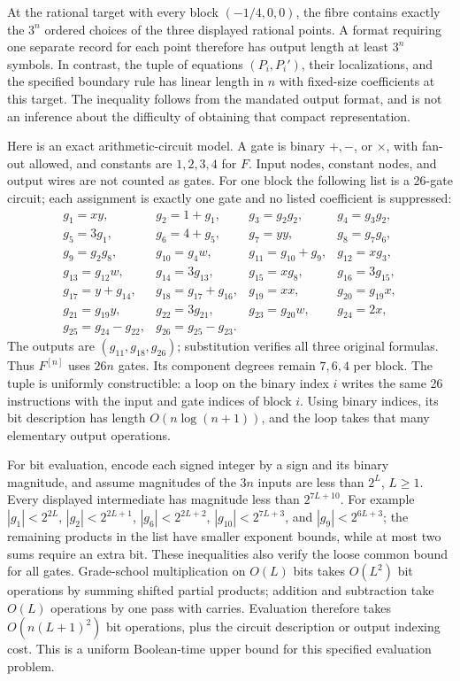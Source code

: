 At the rational target with every block $(-1/4,0,0)$, the fibre contains
exactly the $3^n$ ordered choices of the three displayed rational points.
A format requiring one separate record for each point therefore has
output length at least $3^n$ symbols. In contrast, the tuple of equations
$(P_i,P_i')$, their localizations, and the specified boundary rule has
linear length in $n$ with fixed-size coefficients at this target. The
inequality follows from the mandated output format, and is not an
inference about the difficulty of obtaining that compact representation.

Here is an exact arithmetic-circuit model. A gate is binary $+,-$, or
$\times$, with fan-out allowed, and constants are $1,2,3,4$ for $F$.
Input nodes, constant nodes, and output wires are not counted as gates.
For one block the following list is a 26-gate circuit; each assignment
is exactly one gate and no listed coefficient is suppressed:
\[
\begin{array}{llll}
 g_1=xy,&g_2=1+g_1,&g_3=g_2g_2,&g_4=g_3g_2,\\
 g_5=3g_1,&g_6=4+g_5,&g_7=yy,&g_8=g_7g_6,\\
 g_9=g_2g_8,&g_{10}=g_4w,&g_{11}=g_{10}+g_9,&g_{12}=xg_3,\\
 g_{13}=g_{12}w,&g_{14}=3g_{13},&g_{15}=xg_8,&g_{16}=3g_{15},\\
 g_{17}=y+g_{14},&g_{18}=g_{17}+g_{16},&g_{19}=xx,&g_{20}=g_{19}x,\\
 g_{21}=g_{19}y,&g_{22}=3g_{21},&g_{23}=g_{20}w,&g_{24}=2x,\\
 g_{25}=g_{24}-g_{22},&g_{26}=g_{25}-g_{23}.&&
\end{array}
\]
The outputs are $(g_{11},g_{18},g_{26})$; substitution verifies all
three original formulas. Thus $F^{[n]}$ uses $26n$ gates. Its component
degrees remain $7,6,4$ per block. The tuple is uniformly constructible:
a loop on the binary index $i$ writes the same 26 instructions with
the input and gate indices of block $i$. Using binary indices, its
bit description has length $O(n\log(n+1))$, and the loop takes that
many elementary output operations.

For bit evaluation, encode each signed integer by a sign and its binary
magnitude, and assume magnitudes of the $3n$ inputs are less than $2^L$,
$L\ge1$. Every displayed intermediate has magnitude less than
$2^{7L+10}$. For example $|g_1|<2^{2L}$,
$|g_2|<2^{2L+1}$, $|g_6|<2^{2L+2}$,
$|g_{10}|<2^{7L+3}$, and $|g_9|<2^{6L+3}$;
the remaining products in the list have smaller exponent bounds, while
at most two sums require an extra bit. These inequalities also verify
the loose common bound for all gates. Grade-school multiplication on
$O(L)$ bits takes $O(L^2)$ bit operations by summing shifted partial
products; addition and subtraction take $O(L)$ operations by one pass
with carries. Evaluation therefore takes $O(n(L+1)^2)$ bit operations,
plus the circuit description or output indexing cost. This is a uniform
Boolean-time upper bound for this specified evaluation problem.

